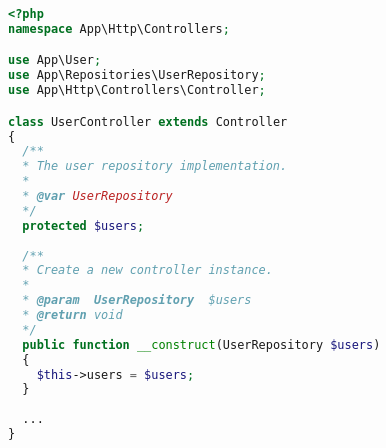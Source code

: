 \documentclass{codedump}
\begin{document}
\begin{lstlisting}[language=PHP,caption={PHP 代码样例}]
<?php
namespace App\Http\Controllers;

use App\User;
use App\Repositories\UserRepository;
use App\Http\Controllers\Controller;

class UserController extends Controller
{
  /**
  * The user repository implementation.
  *
  * @var UserRepository
  */
  protected $users;
  
  /**
  * Create a new controller instance.
  * 
  * @param  UserRepository  $users
  * @return void
  */
  public function __construct(UserRepository $users)
  {
    $this->users = $users;
  }
  
  ...
}
\end{lstlisting}

\end{document}
